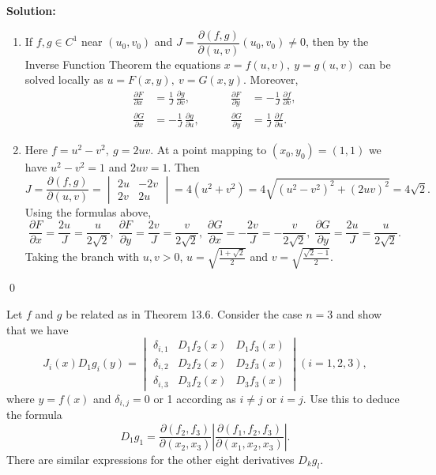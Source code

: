 \bigskip\noindent\textbf{Solution:}
\begin{enumerate}[label=(\alph*)]
    \item If $f,g\in C^1$ near $(u_0,v_0)$ and $J=\dfrac{\partial(f,g)}{\partial(u,v)}(u_0,v_0)\neq 0$, then by the Inverse Function Theorem the equations $x=f(u,v),\ y=g(u,v)$ can be solved locally as $u=F(x,y),\ v=G(x,y)$. Moreover,
    \[
    \begin{aligned}
    \frac{\partial F}{\partial x}&=\frac{1}{J}\,\frac{\partial g}{\partial v},&\qquad \frac{\partial F}{\partial y}&=-\frac{1}{J}\,\frac{\partial f}{\partial v},\\
    \frac{\partial G}{\partial x}&=-\frac{1}{J}\,\frac{\partial g}{\partial u},&\qquad \frac{\partial G}{\partial y}&=\frac{1}{J}\,\frac{\partial f}{\partial u}.
    \end{aligned}
    \]
    \item Here $f=u^2-v^2,\ g=2uv$. At a point mapping to $(x_0,y_0)=(1,1)$ we have $u^2-v^2=1$ and $2uv=1$. Then
    \[J=\frac{\partial(f,g)}{\partial(u,v)}=\begin{vmatrix}2u&-2v\\2v&2u\end{vmatrix}=4(u^2+v^2)=4\sqrt{(u^2-v^2)^2+(2uv)^2}=4\sqrt{2}.
    \]
    Using the formulas above,
    \[\frac{\partial F}{\partial x}=\frac{2u}{J}=\frac{u}{2\sqrt2},\;\frac{\partial F}{\partial y}=\frac{2v}{J}=\frac{v}{2\sqrt2},\;\frac{\partial G}{\partial x}=-\frac{2v}{J}=-\frac{v}{2\sqrt2},\;\frac{\partial G}{\partial y}=\frac{2u}{J}=\frac{u}{2\sqrt2}.
    \]
    Taking the branch with $u,v>0$, $u=\sqrt{\tfrac{1+\sqrt2}{2}}$ and $v=\sqrt{\tfrac{\sqrt2-1}{2}}$.
\end{enumerate}\qed


\begin{problembox}
Let \( f \) and \( g \) be related as in Theorem 13.6. Consider the case \( n = 3 \) and show that we have
\[J_i(x)D_1g_i(y) =
\begin{vmatrix}
\delta_{i,1} & D_1f_2(x) & D_1f_3(x)\\
\delta_{i,2} & D_2f_2(x) & D_2f_3(x)\\
\delta_{i,3} & D_3f_2(x) & D_3f_3(x)
\end{vmatrix}
(i = 1, 2, 3),\]
where \( y = f(x) \) and \( \delta_{i,j} = 0 \) or 1 according as \( i \neq j \) or \( i = j \). Use this to deduce the formula
\[D_1g_1 = \frac{\partial (f_2, f_3)}{\partial (x_2, x_3)} \left| \frac{\partial (f_1, f_2, f_3)}{\partial (x_1, x_2, x_3)} \right|.\]
There are similar expressions for the other eight derivatives \( D_kg_l \).
\end{problembox}

